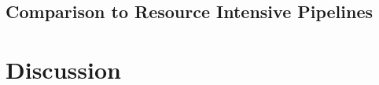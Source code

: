 \documentclass[11pt]{article}
\begin{document}
\begin{multicols}{2}
\subsection{Comparison to Resource Intensive Pipelines}


\section{Discussion}











\end{multicols}
\end{document}
